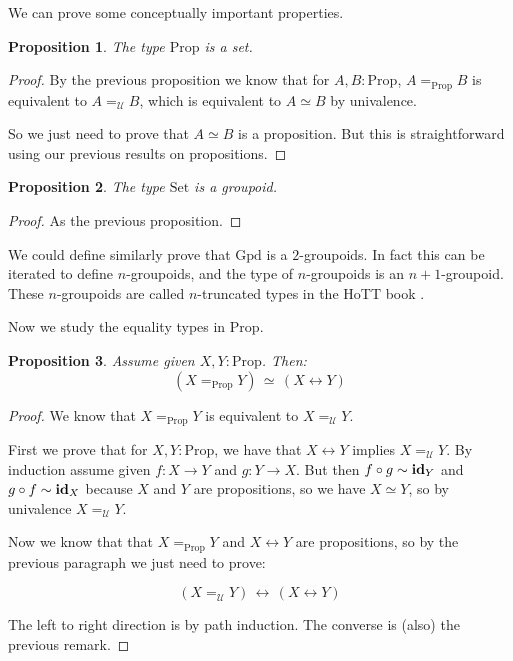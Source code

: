 \documentclass{article}
\newcommand{\U}{{\mathcal U}}
\renewcommand{\r}{\rightarrow}
\newcommand{\id}{\mathrm{\bf id}}
\newcommand{\Set}{\mathrm{Set}}
\newcommand{\Prop}{\mathrm{Prop}}
\newcommand{\Gpd}{\mathrm{Gpd}}
\newtheorem{proposition}{Proposition}
\begin{document}

We can prove some conceptually important properties.

\begin{proposition}
The type $\Prop$ is a set.
\end{proposition}
\begin{proof}
By the previous proposition we know that for $A,B:\Prop$, $A=_\Prop B$ is equivalent to $A=_\U B$, which is equivalent to $A\simeq B$ by univalence.

So we just need to prove that $A\simeq B$ is a proposition. But this is straightforward using our previous results on propositions. %
\end{proof}

\begin{proposition}
The type $\Set$ is a groupoid.
\end{proposition}

\begin{proof}
As the previous proposition.
\end{proof}

We could define similarly prove that $\Gpd$ is a $2$-groupoids. In fact this can be iterated to define $n$-groupoids, and the type of $n$-groupoids is an $n+1$-groupoid. These $n$-groupoids are called $n$-truncated types in the HoTT book \cite{hottbook}.


Now we study the equality types in $\Prop$. %

\begin{proposition}
Assume given $X,Y:\Prop$. Then:
\[(X=_\Prop Y)\, \simeq \, (X\leftrightarrow Y)\]
\end{proposition}
\begin{proof}
We know that $X=_\Prop Y$ is equivalent to $X=_\U Y$. 

First we prove that for $X,Y:\Prop$, we have that $X\leftrightarrow Y$ implies $X=_\U Y$. By induction assume given $f:X\r Y$ and $g: Y\r X$. But then $f\circ g \sim \id_Y$ and $g\circ f\sim \id_X$ because $X$ and $Y$ are propositions, so we have $X\simeq Y$, so by univalence $X=_\U Y$.

Now we know that that $X=_\Prop Y$ and $X\leftrightarrow Y$ are propositions, so by the previous paragraph we just need to prove:

\[(X=_\U Y)\, \leftrightarrow \, (X\leftrightarrow Y)\]

The left to right direction is by path induction. The converse is (also) the previous remark.
\end{proof}
\end{document}
